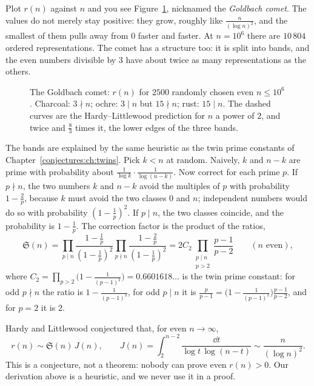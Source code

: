 Plot $r(n)$ against $n$ and you see Figure~\ref{conjectures:fig:comet}, nicknamed the \emph{Goldbach comet}. The values do not merely stay positive: they grow, roughly
like $\frac n{(\log n)^2}$, and the smallest of them pulls away from $0$ faster and faster. At $n=10^6$ there are $10\,804$ ordered representations.
The comet has a structure too: it is split into bands, and the even numbers divisible by $3$ have about twice as many representations as the others.

\begin{figure}[ht]
\centering
{}
\caption{The Goldbach comet: $r(n)$ for $2500$ randomly chosen even $n\le10^6$. Charcoal: $3\nmid n$; ochre: $3\mid n$ but $15\nmid n$; rust: $15\mid n$. The
dashed curves are the Hardy--Littlewood prediction for $n$ a power of $2$, and twice and $\frac83$ times it, the lower edges of the three bands.}
\label{conjectures:fig:comet}
\end{figure}

The bands are explained by the same heuristic as the twin prime constants of Chapter~\ref{conjectures:ch:twins}. Pick $k<n$ at random. Naively, $k$ and $n-k$ are
prime with probability about $\frac1{\log k}\cdot\frac1{\log(n-k)}$. Now correct for each prime $p$. If $p\nmid n$, the two numbers $k$ and $n-k$ avoid
the multiples of $p$ with probability $1-\frac2p$, because $k$ must avoid the two classes $0$ and $n$; independent numbers would do so with probability
$(1-\frac1p)^2$. If $p\mid n$, the two classes coincide, and the probability is $1-\frac1p$. The correction factor is the product of the ratios,
\[
\mathfrak S(n)=\prod_{p\mid n}\frac{1-\frac1p}{(1-\frac1p)^2}\prod_{p\nmid n}\frac{1-\frac2p}{(1-\frac1p)^2}=2C_2\prod_{\substack{p\mid n\\p>2}}\frac{p-1}{p-2}\qquad(n\text{ even}),
\]
where $C_2=\prod_{p>2}\bigl(1-\frac1{(p-1)^2}\bigr)=0.6601618\ldots$ is the twin prime constant: for odd $p\nmid n$ the ratio is $1-\frac1{(p-1)^2}$, for odd
$p\mid n$ it is $\frac p{p-1}=\bigl(1-\frac1{(p-1)^2}\bigr)\frac{p-1}{p-2}$, and for $p=2$ it is $2$.

\begin{remark}\label{conjectures:rem:hlgoldbach}
Hardy and Littlewood conjectured that, for even $n\to\infty$,
\[
r(n)\sim\mathfrak S(n)\,J(n),\qquad J(n)=\int_2^{n-2}\frac{\dd t}{\log t\,\log(n-t)}\sim\frac n{(\log n)^2}.
\]
This is a conjecture, not a theorem: nobody can prove even $r(n)>0$. Our derivation above is a heuristic, and we never use it in a proof.
\end{remark}

